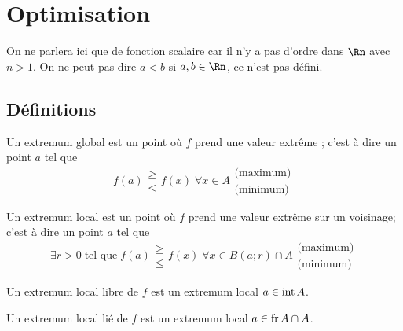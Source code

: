 
\section{Optimisation}

On ne parlera ici que de fonction scalaire car il n'y a pas d'ordre dans $\Rn$ avec $n > 1$.
On ne peut pas dire $a < b$ si $a, b \in \Rn$, ce n'est pas défini.

\subsection{Définitions}

\begin{mydef} Un extremum global est un point où $f$ prend une valeur extrême ; c'est à dire un point $a$ tel que
	\[ f(a) \begin{array}{l} \geq \\ \leq \end{array} f(x) \; \forall x \in A \begin{array}{l} \text{(maximum)} \\ \text{(minimum)}
	\end{array} \]
\end{mydef}

\begin{mydef} Un extremum local est un point où $f$ prend une valeur extrême sur un voisinage; c'est à dire un point $a$ tel que
	\[ \exists r >0 \; \text{tel que} \; f(a) \begin{array}{l} \geq \\ \leq \end{array} f(x) \; \forall x \in B(a;r) \cap A \begin{array}{l} \text{(maximum)} \\ \text{(minimum)}
	\end{array} \]
\end{mydef}

\begin{mydef}
	Un extremum local libre de $f$ est un extremum local $a \in \operatorname{int} A$.
\end{mydef}

\begin{mydef}
	Un extremum local lié de $f$ est un extremum local $a \in \operatorname{fr} A \cap A$.
\end{mydef}

